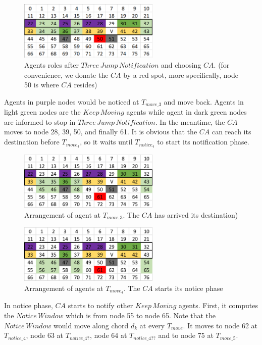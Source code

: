 \begin{figure}[H]
  \centering  
  \includegraphics[width=0.6\textwidth]{figures/T50.png}
  \caption{Agents roles after $Three\,Jump\,Notification$ and choosing $CA$. (for convenience, we donate the $CA$ by a red spot, more specifically, node 50 is where $CA$ resides)}\label{fig:T50}
\end{figure}

Agents in purple nodes would be noticed at $T_{move\_3}$ and move back. Agents in light green nodes are the $Keep\,Moving$ agents while agent in dark green nodes are informed to stop in $Three\,Jump\,Notification$. In the meantime, the $CA$ moves to node 28, 39, 50, and finally 61. It is obvious that the $CA$ can reach its destination before $T_{move_4}$, so it waits until $T_{notice_4}$ to start its notification phase. 

\begin{figure}[H]
  \centering  
  \includegraphics[width=0.6\textwidth]{figures/T611.png}
  \caption{Arrangement of agent at $T_{move\_3}$. The $CA$ has arrived its destination)}\label{fig:T611}
\end{figure}

\begin{figure}[H]
  \centering  
  \includegraphics[width=0.6\textwidth]{figures/T612.png}
  \caption{Arrangement of agents at $T_{move_4}$. The $CA$ starts its notice phase}\label{fig:T612}
\end{figure}
In notice phase, $CA$ starts to notify other $Keep\,Moving$ agents. First, it computes the $Notice\,Window$ which is from node 55 to node 65. Note that the $Notice\,Window$ would move along chord $d_k$ at every $T_{move}$. It moves to node 62 at $T_{notice\_4}$, node 63 at $T_{notice\_4?}$, node 64 at $T_{notice\_4??}$ and to node 75 at $T_{move\_5}$.

